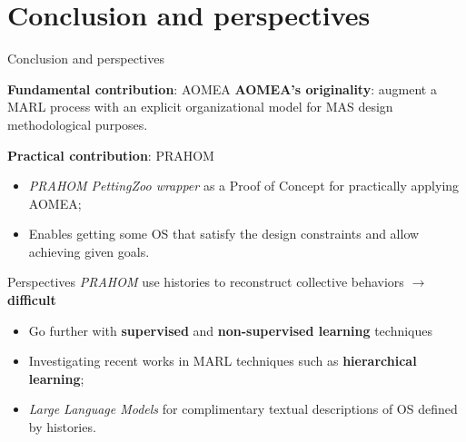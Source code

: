 \section{Conclusion and perspectives}
\begin{frame}{Conclusion and perspectives}
    {}

    \begin{prosblock}{\textbf{Fundamental contribution}: AOMEA}
        \textbf{AOMEA's originality}: augment a MARL process with an explicit organizational model for MAS design methodological purposes.
    \end{prosblock}

    \begin{prosblock}{\textbf{Practical contribution}: PRAHOM}

        \begin{itemize}
            \item \emph{PRAHOM PettingZoo wrapper} as a Proof of Concept for practically applying AOMEA;
            \item Enables getting some OS that satisfy the design constraints and allow achieving given goals.
        \end{itemize}

    \end{prosblock}

    \begin{alertblock}{Perspectives}
        \emph{PRAHOM} use histories to reconstruct collective behaviors $\rightarrow$ \textbf{difficult}
        \begin{itemize}
            \item Go further with \textbf{supervised} and \textbf{non-supervised learning} techniques
            \item Investigating recent works in MARL techniques such as \textbf{hierarchical learning};
            \item \emph{Large Language Models} for complimentary textual descriptions of OS defined by histories.
        \end{itemize}
    \end{alertblock}

\end{frame}
